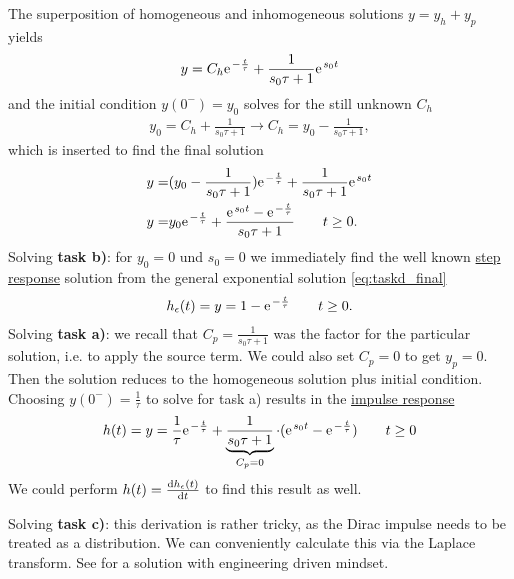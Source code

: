 \documentclass[11pt,a4paper,DIV=12]{scrartcl}
\begin{document}
The superposition of homogeneous and inhomogeneous solutions $y = y_h + y_p$ yields
\begin{align}
y = C_h \e^{- \frac{t}{\tau}} + \frac{1}{s_0 \tau + 1} \e^{s_0 t}
\end{align}
and the initial condition $y(0^-)=y_0$ solves for the still unknown $C_h$
%
\begin{align}
y_0 = C_h + \frac{1}{s_0 \tau + 1} \rightarrow C_h = y_0 - \frac{1}{s_0 \tau + 1},
\end{align}
which is inserted to find the final solution
\begin{align}
y =& (y_0 - \frac{1}{s_0 \tau + 1}) \e^{-\frac{t}{\tau}} + \frac{1}{s_0 \tau + 1} \e^{s_0 t}\\
\label{eq:taskd_final}
y =& y_0 \e^{-\frac{t}{\tau}} + \frac{\e^{s_0 t} - \e^{-\frac{t}{\tau}}}{s_0 \tau + 1} \qquad t \geq 0.
\end{align}
%
Solving \textbf{task b)}: for $y_0=0$ und $s_0 = 0$ we immediately find the well known \underline{step response} solution from the general exponential solution \eqref{eq:taskd_final}
\begin{align}
h_\epsilon(t) = y = 1 - \e^{-\frac{t}{\tau}} \qquad t \geq 0.
\end{align}
Solving \textbf{task a)}: we recall that $C_p=\frac{1}{s_0 \tau + 1}$ was the factor for the
particular solution, i.e. to apply the source term. We could also set $C_p=0$ to get $y_p=0$. Then the solution reduces to
the homogeneous solution plus initial condition. Choosing $y(0^-)=\frac{1}{\tau}$ to solve for task a) results in the \underline{impulse response}
\begin{align}
h(t) = y = \frac{1}{\tau} \e^{-\frac{t}{\tau}} + \underbrace{\frac{1}{s_0 \tau + 1}}_{C_p=0} \cdot (\e^{s_0 t} - \e^{-\frac{t}{\tau}})   \qquad t \geq 0
\end{align}
We could perform $h(t) = \frac{\mathrm{d} h_\epsilon(t)}{\mathrm{d} t}$ to find this result as well.

Solving \textbf{task c)}: this derivation is rather tricky, as the Dirac impulse needs to be treated as a distribution. We can conveniently calculate this via the Laplace transform. See \cite{Strang2014} for a solution with engineering driven mindset.
\end{document}
